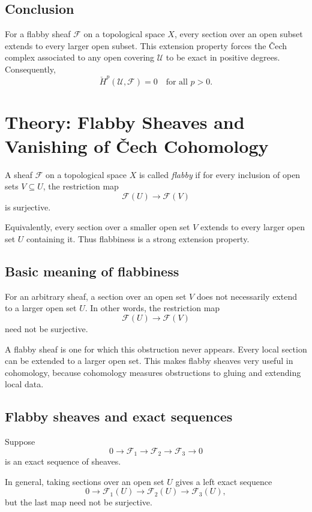 \documentclass[12pt,a4paper]{article}
\theoremstyle{notespace}
\begin{document}
\subsection{Conclusion}

For a flabby sheaf $\mathcal F$ on a topological space $X$, every section
over an open subset extends to every larger open subset. This extension
property forces the \v{C}ech complex associated to any open covering
$\mathcal U$ to be exact in positive degrees. Consequently,
\[
\boxed{
	\check H^p(\mathcal U,\mathcal F)=0
	\quad\text{for all }p>0.
}
\]
\section{Theory: Flabby Sheaves and Vanishing of \v{C}ech Cohomology}

A sheaf $\mathcal F$ on a topological space $X$ is called \emph{flabby}
if for every inclusion of open sets $V\subseteq U$, the restriction map
\[
\mathcal F(U)\longrightarrow \mathcal F(V)
\]
is surjective.

Equivalently, every section over a smaller open set $V$ extends to every
larger open set $U$ containing it. Thus flabbiness is a strong extension
property.

\subsection*{Basic meaning of flabbiness}

For an arbitrary sheaf, a section over an open set $V$ does not necessarily
extend to a larger open set $U$. In other words, the restriction map
\[
\mathcal F(U)\to \mathcal F(V)
\]
need not be surjective.

A flabby sheaf is one for which this obstruction never appears. Every local
section can be extended to a larger open set. This makes flabby sheaves very
useful in cohomology, because cohomology measures obstructions to gluing and
extending local data.

\subsection*{Flabby sheaves and exact sequences}

Suppose
\[
0\longrightarrow \mathcal F_1
\longrightarrow \mathcal F_2
\longrightarrow \mathcal F_3
\longrightarrow 0
\]
is an exact sequence of sheaves.

In general, taking sections over an open set $U$ gives a left exact sequence
\[
0\longrightarrow \mathcal F_1(U)
\longrightarrow \mathcal F_2(U)
\longrightarrow \mathcal F_3(U),
\]
but the last map need not be surjective.
\end{document}
